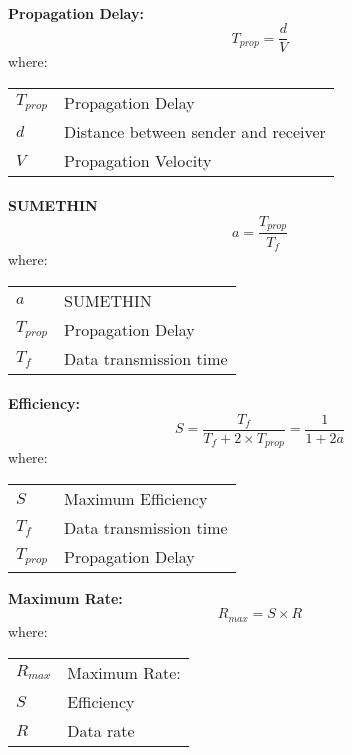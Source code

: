 \documentclass[../resumosRCOM.tex]{subfiles}
\makeatletter
\newenvironment{conditions}
  {\par\vspace{\abovedisplayskip}\noindent\begin{tabular}{>{$}l<{$} @{${}={}$} l}}
  {\end{tabular}\par\vspace{\belowdisplayskip}}
\makeatother
\begin{document}
\paragraph{}
\textbf{Propagation Delay:}
\begin{equation}
    {T_{prop}}=\frac{d}{V}
\end{equation}
where:
\begin{conditions}
    T_{prop}    &  Propagation Delay \\
   d     &   Distance between sender and receiver \\
   V &  Propagation Velocity
\end{conditions}

\paragraph{}
\textbf{SUMETHIN}
\begin{equation}
    {a}=\frac{T_{prop}}{T_f}
\end{equation}
where:
\begin{conditions}
    a &  SUMETHIN\\
    T_{prop}    &  Propagation Delay \\
   T_f     &  Data transmission time 
  
\end{conditions}

\paragraph{}
\textbf{Efficiency:}
\begin{equation}
    {S}=\frac{T_f}{T_f + 2 \times T_{prop}} = \frac{1}{1+2a}
\end{equation}
where:
\begin{conditions}
    S    &  Maximum Efficiency \\
   T_f     &   Data transmission time\\
   T_{prop} &  Propagation Delay 
\end{conditions}

\textbf{Maximum Rate:}
\begin{equation}
    {R_{max}}={S}\times{R}
\end{equation}
where:
\begin{conditions}
    R_{max}   &  Maximum Rate: \\
   S     &  Efficiency\\
   R &  Data rate
\end{conditions}
\end{document}
